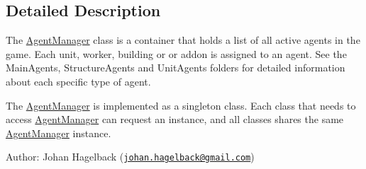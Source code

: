 \subsection{Detailed Description}
The \hyperlink{class_agent_manager}{Agent\-Manager} class is a container that holds a list of all active agents in the game. Each unit, worker, building or or addon is assigned to an agent. See the Main\-Agents, Structure\-Agents and Unit\-Agents folders for detailed information about each specific type of agent.

The \hyperlink{class_agent_manager}{Agent\-Manager} is implemented as a singleton class. Each class that needs to access \hyperlink{class_agent_manager}{Agent\-Manager} can request an instance, and all classes shares the same \hyperlink{class_agent_manager}{Agent\-Manager} instance.

Author\-: Johan Hagelback (\href{mailto:johan.hagelback@gmail.com}{\tt johan.\-hagelback@gmail.\-com}) 

